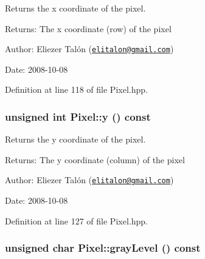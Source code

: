 Returns the x coordinate of the pixel. 

\begin{Desc}
\item[Returns:]The x coordinate (row) of the pixel\end{Desc}
\begin{Desc}
\item[Author:]Eliezer Talón (\href{mailto:elitalon@gmail.com}{\tt elitalon@gmail.com}) \end{Desc}
\begin{Desc}
\item[Date:]2008-10-08 \end{Desc}


Definition at line 118 of file Pixel.hpp.\hypertarget{class_pixel_204cc91a99e1e4f1d96c9cf6caf5747a}{
\subsubsection[y]{\setlength{\rightskip}{0pt plus 5cm}unsigned int Pixel::y () const}}
\label{class_pixel_204cc91a99e1e4f1d96c9cf6caf5747a}


Returns the y coordinate of the pixel. 

\begin{Desc}
\item[Returns:]The y coordinate (column) of the pixel\end{Desc}
\begin{Desc}
\item[Author:]Eliezer Talón (\href{mailto:elitalon@gmail.com}{\tt elitalon@gmail.com}) \end{Desc}
\begin{Desc}
\item[Date:]2008-10-08 \end{Desc}


Definition at line 127 of file Pixel.hpp.\hypertarget{class_pixel_d82be37dbb53c7ba48c5464b3a3382c6}{
\subsubsection[grayLevel]{\setlength{\rightskip}{0pt plus 5cm}unsigned char Pixel::grayLevel () const}}
\label{class_pixel_d82be37dbb53c7ba48c5464b3a3382c6}


